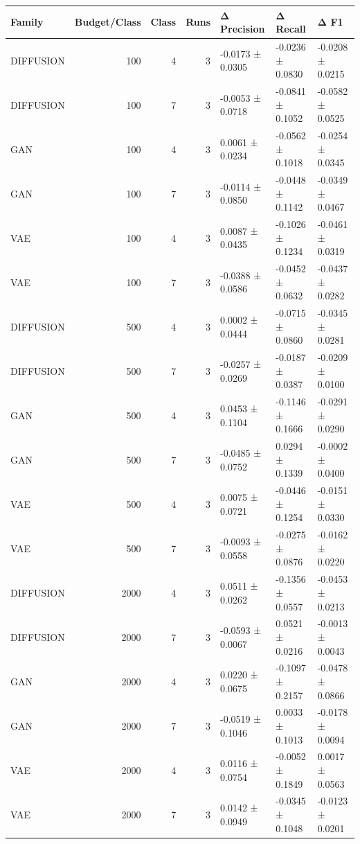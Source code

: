 \begin{tabular}{lrrrlll}
\toprule
Family & Budget/Class & Class & Runs & Δ Precision & Δ Recall & Δ F1 \\
\midrule
DIFFUSION & 100 & 4 & 3 & -0.0173 ± 0.0305 & -0.0236 ± 0.0830 & -0.0208 ± 0.0215 \\
DIFFUSION & 100 & 7 & 3 & -0.0053 ± 0.0718 & -0.0841 ± 0.1052 & -0.0582 ± 0.0525 \\
GAN & 100 & 4 & 3 & 0.0061 ± 0.0234 & -0.0562 ± 0.1018 & -0.0254 ± 0.0345 \\
GAN & 100 & 7 & 3 & -0.0114 ± 0.0850 & -0.0448 ± 0.1142 & -0.0349 ± 0.0467 \\
VAE & 100 & 4 & 3 & 0.0087 ± 0.0435 & -0.1026 ± 0.1234 & -0.0461 ± 0.0319 \\
VAE & 100 & 7 & 3 & -0.0388 ± 0.0586 & -0.0452 ± 0.0632 & -0.0437 ± 0.0282 \\
DIFFUSION & 500 & 4 & 3 & 0.0002 ± 0.0444 & -0.0715 ± 0.0860 & -0.0345 ± 0.0281 \\
DIFFUSION & 500 & 7 & 3 & -0.0257 ± 0.0269 & -0.0187 ± 0.0387 & -0.0209 ± 0.0100 \\
GAN & 500 & 4 & 3 & 0.0453 ± 0.1104 & -0.1146 ± 0.1666 & -0.0291 ± 0.0290 \\
GAN & 500 & 7 & 3 & -0.0485 ± 0.0752 & 0.0294 ± 0.1339 & -0.0002 ± 0.0400 \\
VAE & 500 & 4 & 3 & 0.0075 ± 0.0721 & -0.0446 ± 0.1254 & -0.0151 ± 0.0330 \\
VAE & 500 & 7 & 3 & -0.0093 ± 0.0558 & -0.0275 ± 0.0876 & -0.0162 ± 0.0220 \\
DIFFUSION & 2000 & 4 & 3 & 0.0511 ± 0.0262 & -0.1356 ± 0.0557 & -0.0453 ± 0.0213 \\
DIFFUSION & 2000 & 7 & 3 & -0.0593 ± 0.0067 & 0.0521 ± 0.0216 & -0.0013 ± 0.0043 \\
GAN & 2000 & 4 & 3 & 0.0220 ± 0.0675 & -0.1097 ± 0.2157 & -0.0478 ± 0.0866 \\
GAN & 2000 & 7 & 3 & -0.0519 ± 0.1046 & 0.0033 ± 0.1013 & -0.0178 ± 0.0094 \\
VAE & 2000 & 4 & 3 & 0.0116 ± 0.0754 & -0.0052 ± 0.1849 & 0.0017 ± 0.0563 \\
VAE & 2000 & 7 & 3 & 0.0142 ± 0.0949 & -0.0345 ± 0.1048 & -0.0123 ± 0.0201 \\
\bottomrule
\end{tabular}
